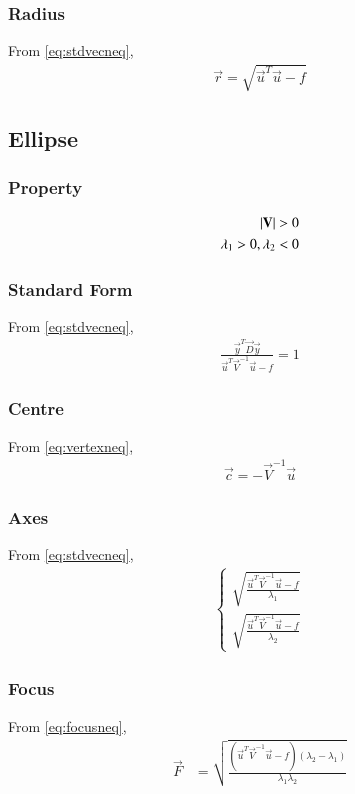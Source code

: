 \documentclass[journal,12pt,twocolumn]{IEEEtran}
\begin{document}
\subsubsection{Radius}
From \eqref{eq:stdvecneq},
\begin{align}
    \vec{r} = \sqrt{\vec{u}^T\vec{u} - f}
\end{align}
\subsection{Ellipse}
\subsubsection{Property}
\begin{align}
    \left\vert\mathbf{V}\right\vert > 0
    \\
    \lambda_1>0,\lambda_2<0
\end{align}
\subsubsection{Standard Form}
From \eqref{eq:stdvecneq},
\begin{align}
    \frac{\vec{y}^T\vec{D}\vec{y}}{\vec{u}^T\vec{V}^{-1}\vec{u}-f}=1
\end{align}
\subsubsection{Centre}
From \eqref{eq:vertexneq},
\begin{align}
    \vec{c} = -\vec{V}^{-1}\vec{u}
\end{align}
\subsubsection{Axes}
From \eqref{eq:stdvecneq},
\begin{align}
\begin{cases}
    \sqrt{\frac{\vec{u}^T\vec{V}^{-1}\vec{u}-f}{\lambda_1}}
    \\
    \sqrt{\frac{\vec{u}^T\vec{V}^{-1}\vec{u}-f}{\lambda_2}}
\end{cases}
\end{align}
\subsubsection{Focus}
From \eqref{eq:focusneq},
\begin{align}
    \vec{F} &= \sqrt{\frac{(\vec{u}^T\vec{V}^{-1}\vec{u}-f)(\lambda_2-\lambda_1)}{\lambda_1\lambda_2}}
\end{align}
\end{document}
